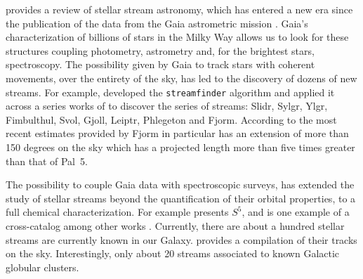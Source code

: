 \documentclass{aa}
\begin{document}
  
  \citet{2024arXiv240519410B} provides a review of stellar stream astronomy, which has entered a new era since the publication of the data from the Gaia astrometric mission \citep{2016A&A...595A...1G}. Gaia's characterization of billions of stars in the Milky Way allows us to look for these structures coupling photometry, astrometry and, for the brightest stars, spectroscopy. The possibility given by Gaia to track stars with coherent movements, over the entirety of the sky, has led to the discovery of dozens of new streams. For example, \citet{2018MNRAS.477.4063M} developed the \texttt{streamfinder} algorithm and applied it across a series works of \citep{2018MNRAS.481.3442M,  2018ApJ...865...85I, 2019ApJ...872..152I} to discover the series of streams: Slidr, Sylgr, Ylgr, Fimbulthul, Svol, Gjoll, Leiptr, Phlegeton and Fjorm.  According to the most recent estimates provided by \citet{2020MNRAS.493.4978S} Fjorm in particular has an extension of more than 150 degrees on the sky which has a projected length more than five times greater than that of Pal~5. 
  
  The possibility to couple Gaia data with spectroscopic surveys, has extended the study of stellar streams beyond the quantification of their orbital properties, to a full chemical characterization. For example \citet{2019MNRAS.490.3508L} presents $S^5$, and is one example of a cross-catalog among other works \citep{2020AJ....160..181J, 2021ApJ...911..149L, 2022ApJ...928...30L, 2024MNRAS.529.2413U}. Currently, there are about a hundred stellar streams are currently known in our Galaxy. \citet{2023MNRAS.520.5225M} provides a compilation of their tracks on the sky. Interestingly, only about 20 streams associated to known Galactic globular clusters.
\end{document}
